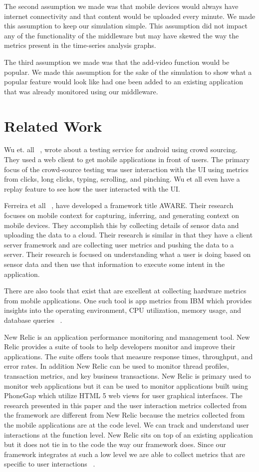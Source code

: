 The second assumption we made was that mobile devices would always have internet connectivity and that content would be uploaded every minute. We made this assumption to keep our simulation simple. This assumption did not impact any of the functionality of the middleware but may have skewed the way the metrics present in the time-series analysis graphs.

The third assumption we made was that the add-video function would be popular. We made this assumption for the sake of the simulation to show what a popular feature would look like had one been added to an existing application that was already monitored using our middleware. 

\section{Related Work}
Wu et. all ~\cite{appcheck}, wrote about a testing service for android using crowd sourcing. They used a web client to get mobile applications in front of users. The primary focus of the crowd-source testing was user interaction with the UI using metrics from clicks, long clicks, typing, scrolling, and pinching. Wu et all even have a replay feature to see how the user interacted with the UI. 

Ferreira et all  ~\cite{aware}, have developed a framework title AWARE. Their research focuses on mobile context for capturing, inferring, and generating context on mobile devices.  They accomplish this by collecting details of sensor data and uploading the data to a cloud. Their research is similar in that they have a client server framework and are collecting user metrics and pushing the data to a server. Their research is focused on understanding what a user is doing based on sensor data and then use that information to execute some intent in the application.

There are also tools that exist that are excellent at collecting hardware metrics from mobile applications. One such tool is app metrics from IBM which provides insights into the operating environment, CPU utilization, memory usage, and database queries ~\cite{ibm-appmetrics}.

New Relic is an application performance monitoring and management tool. New Relic provides a suite of tools to help developers monitor and improve their applications. The suite offers tools that measure response times, throughput, and error rates. In addition New Relic can be used to monitor thread profiles, transaction metrics, and key business transactions. New Relic is primary used to monitor web applications but it can be used to monitor applications built using PhoneGap which utilize HTML 5 web views for user graphical interfaces. The research presented in this paper and the user interaction metrics collected from the framework are different from New Relic because the metrics collected from the mobile applications are at the code level. We can track and understand user interactions at the function level. New Relic sits on top of an existing application but it does not tie in to the code the way our framework does. Since our framework integrates at such a low level we are able to collect metrics that are specific to user interactions ~\cite{newrelic}.

